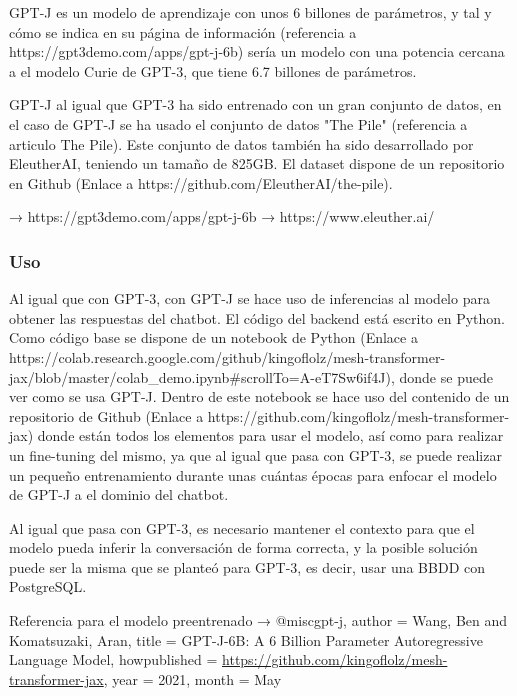 GPT-J es un modelo de aprendizaje con unos 6 billones de parámetros, y tal y cómo se indica en su página de información (referencia a https://gpt3demo.com/apps/gpt-j-6b) sería un modelo con una potencia cercana a el modelo Curie de GPT-3, que tiene 6.7 billones de parámetros.

GPT-J al igual que GPT-3 ha sido entrenado con un gran conjunto de datos, en el caso de GPT-J se ha usado el conjunto de datos "The Pile" (referencia a articulo The Pile). Este conjunto de datos también ha sido desarrollado por EleutherAI, teniendo un tamaño de 825GB. El dataset dispone de un repositorio en Github (Enlace a https://github.com/EleutherAI/the-pile).






→ https://gpt3demo.com/apps/gpt-j-6b
→ https://www.eleuther.ai/

\subsubsection*{Uso}

Al igual que con GPT-3, con GPT-J se hace uso de inferencias al modelo para obtener las respuestas del chatbot. El código del backend está escrito en Python. Como código base se dispone de un notebook de Python (Enlace a https://colab.research.google.com/github/kingoflolz/mesh-transformer-jax/blob/master/colab_demo.ipynb#scrollTo=A-eT7Sw6if4J), donde se puede ver como se usa GPT-J. Dentro de este notebook se hace uso del contenido de un repositorio de Github (Enlace a https://github.com/kingoflolz/mesh-transformer-jax) donde están todos los elementos para usar el modelo, así como para realizar un fine-tuning del mismo, ya que al igual que pasa con GPT-3, se puede realizar un pequeño entrenamiento durante unas cuántas épocas para enfocar el modelo de GPT-J a el dominio del chatbot.

Al igual que pasa con GPT-3, es necesario mantener el contexto para que el modelo pueda inferir la conversación de forma correcta, y la posible solución puede ser la misma que se planteó para GPT-3, es decir, usar una BBDD con PostgreSQL.







Referencia para el modelo preentrenado → @misc{gpt-j,
  author = {Wang, Ben and Komatsuzaki, Aran},
  title = {{GPT-J-6B: A 6 Billion Parameter Autoregressive Language Model}},
  howpublished = {\url{https://github.com/kingoflolz/mesh-transformer-jax}},
  year = 2021,
  month = May
}

